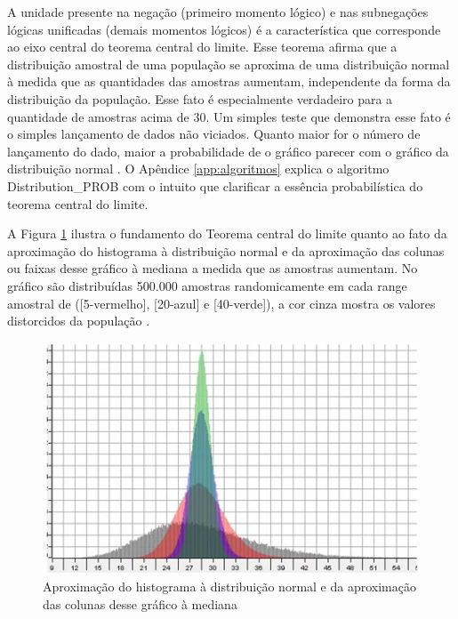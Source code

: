 A unidade presente na negação (primeiro momento lógico) e nas subnegações lógicas unificadas (demais momentos lógicos) é a característica que corresponde ao eixo central do teorema central do limite. Esse teorema afirma que a distribuição amostral de uma população se aproxima de uma distribuição normal à medida que as quantidades das amostras aumentam, independente da forma da distribuição da população. Esse fato é especialmente verdadeiro para a quantidade de amostras acima de 30. Um simples teste que demonstra esse fato é o simples lançamento de dados não viciados. Quanto maior for o número de lançamento do dado, maior a probabilidade de o gráfico parecer com o gráfico da distribuição normal \cite{statisticshowto_teorema_central_limite}. O Apêndice \ref{app:algoritmos} explica o algoritmo Distribution\_PROB com o intuito que clarificar a essência probabilística do teorema central do limite. 

A Figura \ref{fig:statisticsbyjim_central_limit_theorem} ilustra o fundamento do Teorema central do limite quanto ao fato da aproximação do histograma à distribuição normal e da aproximação das colunas ou faixas desse gráfico à mediana a medida que as amostras aumentam. No gráfico são distribuídas 500.000 amostras randomicamente em cada range amostral de ([5-vermelho], [20-azul] e [40-verde]), a cor cinza mostra os valores distorcidos da população \cite{statisticsbyjim_central_limite_theorem_explainded}.
\begin{figure}[H]
\caption{Aproximação do histograma à distribuição normal e da aproximação das colunas desse gráfico à mediana}
\label{fig:statisticsbyjim_central_limit_theorem}
\centering
\includegraphics[scale=1.2]{sections/images/statisticsbyjim_central_limit_theorem.jpg}
\end{figure}

